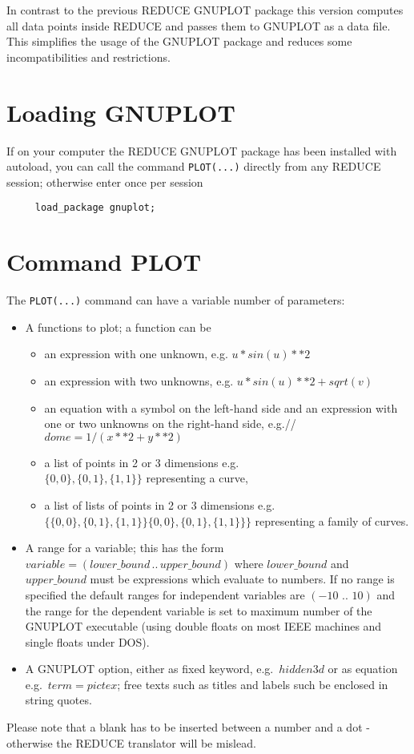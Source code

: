 In contrast to the previous {\small REDUCE} GNUPLOT package
this version computes all data points inside REDUCE and
passes them to GNUPLOT as a data file. 
This simplifies the usage of the GNUPLOT package
and reduces some incompatibilities and restrictions. 


\section{Loading GNUPLOT}
 
If on your computer the {\small REDUCE} GNUPLOT package
has been installed with autoload, you can call the command
\verb+PLOT(...)+ directly from any {\small REDUCE} session;
otherwise enter once per session
\begin{verbatim}
     load_package gnuplot;
\end{verbatim}

\section{Command PLOT}

The \verb+PLOT(...)+ command can have a variable number of
parameters:

\begin{itemize}
\item A functions to plot; a function can be
  \begin{itemize}
    \item an expression with one unknown, e.g. $u*sin(u)**2$
    \item an expression with two unknowns, e.g. 
          $u*sin(u)**2+sqrt(v)$
    \item an equation with a symbol on the left-hand side
         and an expression with one or two unknowns on the
         right-hand side, e.g.// $dome=1/(x**2+y**2)$
    \item a list of points in 2 or 3 dimensions
         e.g. \\ $\{0,0\},\{0,1\},\{1,1\}\}$ representing
         a curve,
    \item a list of lists of points in 2 or 3 dimensions
         e.g.\\ $\{\{0,0\},\{0,1\},\{1,1\}\}
                 \{0,0\},\{0,1\},\{1,1\}\}\}$
         representing a family of curves.
  \end{itemize}
\item A range for a variable; this has the form\\
    $variable=(lower\_bound\, . . \, upper\_bound)$ where
  $lower\_bound$ and $upper\_bound$ must be expressions which
  evaluate to numbers. If no range is specified the
  default ranges for independent variables are $(-10\,\,..\,\,10)$
  and the range for the dependent variable is set to 
  maximum number of the GNUPLOT executable (using double
  floats on most IEEE machines and single floats under DOS).
\item A GNUPLOT option, either as fixed keyword,
  e.g.\  $hidden3d$ or as equation e.g.\ $term=pictex$;
  free texts such as titles and labels such be enclosed in
  string quotes.
\end{itemize}
Please note that a blank has to be inserted between a number
and a dot - otherwise the REDUCE translator will be mislead.
 
